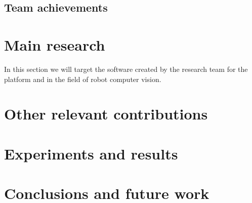 %
\subsection{Team achievements}



%
\section{Main research}
In this section we will target the software created by the research team for the platform and in the field of robot computer vision.


\section{Other relevant contributions}



\section{Experiments and results}



\section{Conclusions and future work}



\newpage



\newpage
\robospecs

\nocite{*}


